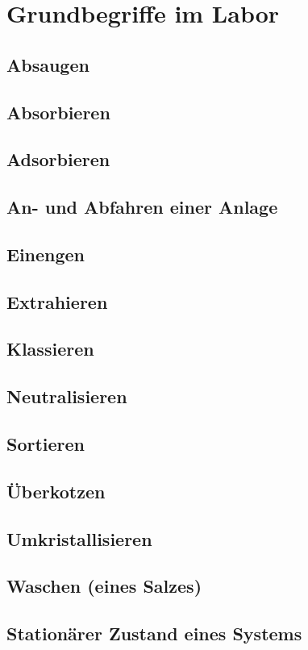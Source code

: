 \section{Grundbegriffe im Labor}
\subsection{Absaugen}
\subsection{Absorbieren}
\subsection{Adsorbieren}
\subsection{An- und Abfahren einer Anlage}
\subsection{Einengen}
\subsection{Extrahieren}
\subsection{Klassieren}
\subsection{Neutralisieren}
\subsection{Sortieren}
\subsection{Überkotzen}
\subsection{Umkristallisieren}
\subsection{Waschen (eines Salzes)}
\subsection{Stationärer Zustand eines Systems}






